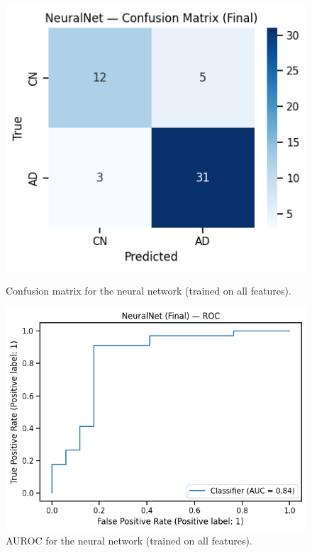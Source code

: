 \documentclass[a4paper,12pt]{article}
\begin{document}
\begin{figure}[H]
\centering
\begin{minipage}{0.48\textwidth}
    \centering
    \includegraphics[width=\textwidth]{Pics/nn_confusion_matrix.png}
    \caption{Confusion matrix for the neural network (trained on all features).}
    \label{fig:nn-cm}
\end{minipage}
\hfill
\begin{minipage}{0.48\textwidth}
    \centering
    \includegraphics[width=\textwidth]{Pics/nn_roc.png}
    \caption{AUROC for the neural network (trained on all features).}
    \label{fig:nn-roc}
\end{minipage}
\end{figure}
\end{document}

